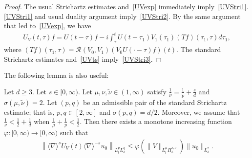 \documentclass[AHL,Unicode,longabstracts,MathTools,published]{cedram}
\newcommand{\CR}{\mathcal{R}}
\newcommand{\ph}{\varphi}
\newcommand{\ta}{\tau}
\newcommand{\si}{\sigma}
\newcommand{\wt}{\widetilde}
\newcommand{\I}{\infty}
\newcommand{\sd}{\langle \nabla \rangle}
\newcommand{\tw}{\frac{1}{2}}
\begin{document}
\begin{proof}
The usual Strichartz estimates and~\eqref{UVexp} immediately imply~\eqref{UVStri1}. \eqref{UVStri1} and usual duality argument imply~\eqref{UVStri2}. By the same argument that led to~\eqref{UVexp}, we have
\begin{align}\label{UVts}
U_V(t,\ta)f = U(t-\ta)f - i \int_\ta^t U(t-\ta_1) V_1(\ta_1) (Tf)(\ta_1,\ta) d\ta_1,
\end{align}
where $(Tf)(\ta_1,\ta)= \CR(V_0,V_1)(V_0U(\cdot-\ta)f)(t)$. The standard Strichartz estimates and~\eqref{UVts} imply~\eqref{UVStri3}.
\end{proof}

The following lemma is also useful:

\begin{lemm} \label{almost commu}
Let $d \ge 3$. Let $s \in [0,\I)$. Let $\mu, \nu,\wt{\nu} \in (1, \I)$ satisfy $\frac{1}{\nu} = \frac{1}{\wt{\nu}} + \frac{s}{d}$ and $\si(\mu,\wt{\nu})=2$. Let $(p,q)$ be an admissible pair of the standard Strichartz estimate; that is, $p, q \in [2,\I]$ and $\si(p,q) = d/2$. Moreover, we assume that $\frac{1}{\nu} < \tw + \frac{1}{d}$ when $\frac{1}{\mu}+\frac{1}{p}<\tw$. Then there exists a monotone increasing function $\ph:[0,\I) \to [0,\I)$ such that
\begin{align}
\left\|\sd^s U_V(t) \sd^{-s} u_0\right\|_{L^p_t L^q_x} \le \ph\left(\|V\|_{L^\mu_t H^{s,\nu}_x}\right) \|u_0\|_{L^2_x}.
\end{align}
\end{lemm}
\end{document}

